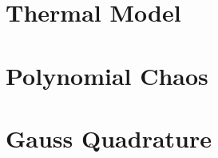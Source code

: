 \renewcommand{\thesection}{S\arabic{section}}
\renewcommand{\thetable}{S\arabic{table}}
\renewcommand{\thefigure}{S\arabic{figure}}
\setcounter{table}{0}
\setcounter{figure}{0}

\section{Thermal Model} 


\section{Polynomial Chaos}
\section{Gauss Quadrature}
